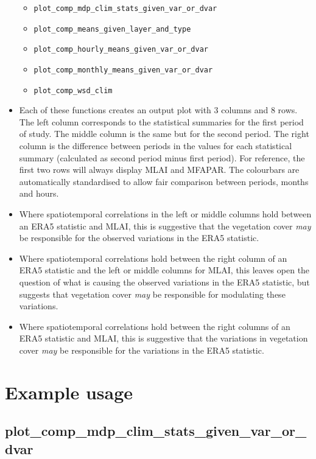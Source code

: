 \begin{itemize}
	\begin{itemize}
		\item \verb+plot_comp_mdp_clim_stats_given_var_or_dvar+
		\item \verb+plot_comp_means_given_layer_and_type+
		\item \verb+plot_comp_hourly_means_given_var_or_dvar+
		\item \verb+plot_comp_monthly_means_given_var_or_dvar+
		\item \verb+plot_comp_wsd_clim+
	\end{itemize}
	\item Each of these functions creates an output plot with 3 columns and 8 rows. The left column corresponds to the statistical summaries for the first period of study. The middle column is the same but for the second period. The right column is the difference between periods in the values for each statistical summary (calculated as second period minus first period). For reference, the first two rows will always display \ac{MLAI} and \ac{MFAPAR}. The colourbars are automatically standardised to allow fair comparison between periods, months and hours.
	\item Where spatiotemporal correlations in the left or middle columns hold between an \ac{ERA5} statistic and \ac{MLAI}, this is suggestive that the vegetation cover \textit{may} be responsible for the observed variations in the \ac{ERA5} statistic.
	\item Where spatiotemporal correlations hold between the right column of an \ac{ERA5} statistic and the left or middle columns for \ac{MLAI}, this leaves open the question of what is causing the observed variations in the \ac{ERA5} statistic, but suggests that vegetation cover \textit{may} be responsible for modulating these variations.
	\item Where spatiotemporal correlations hold between the right columns of an \ac{ERA5} statistic and \ac{MLAI}, this is suggestive that the variations in vegetation cover \textit{may} be responsible for the variations in the \ac{ERA5} statistic.
\end{itemize}

\section{Example usage}

\subsection{plot\_comp\_mdp\_clim\_stats\_given\_var\_or\_dvar}

